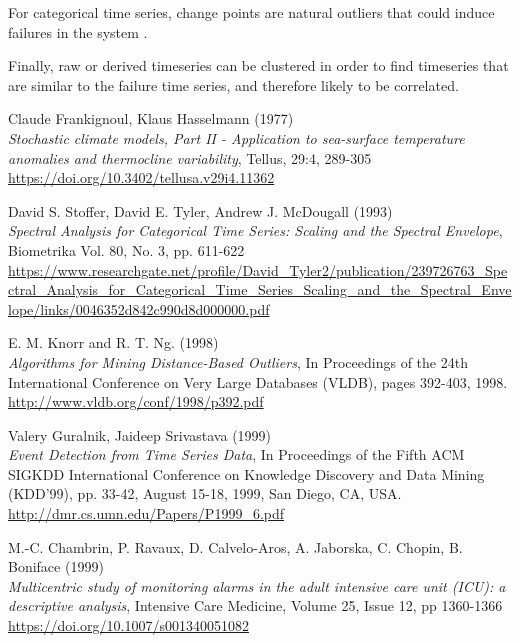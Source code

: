 \documentclass[12pt,a4paper]{article}
\begin{document}
For categorical time series, change points are natural outliers that could induce failures in the system \cite{categorical-time-series, detect-change-points}.

Finally, raw or derived timeseries \cite{parameter-free-clustering} can be clustered in order to find timeseries that are similar to the failure time series, and therefore likely to be correlated. \\

\clearpage

\begin{thebibliography}{9}
Claude Frankignoul, Klaus Hasselmann (1977) \\
\textit{Stochastic climate models, Part II - Application to sea-surface temperature anomalies and thermocline variability},
Tellus, 29:4, 289-305\\
\url{https://doi.org/10.3402/tellusa.v29i4.11362}

David S. Stoffer, David E. Tyler, Andrew J. McDougall (1993)\\
\textit{Spectral Analysis for Categorical Time Series: Scaling and the Spectral Envelope},
Biometrika Vol. 80, No. 3, pp. 611-622\\
\url{https://www.researchgate.net/profile/David_Tyler2/publication/239726763_Spectral_Analysis_for_Categorical_Time_Series_Scaling_and_the_Spectral_Envelope/links/0046352d842c990d8d000000.pdf}

E. M. Knorr and R. T. Ng. (1998)\\
\textit{Algorithms for Mining Distance-Based Outliers}, In Proceedings of the 24th
International Conference on Very Large Databases (VLDB), pages 392-403, 1998.\\
\url{http://www.vldb.org/conf/1998/p392.pdf}

Valery Guralnik, Jaideep Srivastava (1999)\\
\textit{Event Detection from Time Series Data}, In Proceedings of the Fifth ACM SIGKDD International Conference on Knowledge Discovery and Data Mining (KDD'99), pp. 33-42, August 15-18, 1999, San Diego, CA, USA. \\
\url{http://dmr.cs.umn.edu/Papers/P1999_6.pdf}

M.-C. Chambrin, P. Ravaux, D. Calvelo-Aros, A. Jaborska, C. Chopin, B. Boniface (1999)\\
\textit{Multicentric study of monitoring alarms in the adult intensive care unit (ICU): a descriptive analysis},
Intensive Care Medicine, Volume 25, Issue 12, pp 1360-1366\\
\url{https://doi.org/10.1007/s001340051082}


\end{thebibliography}
\end{document}

